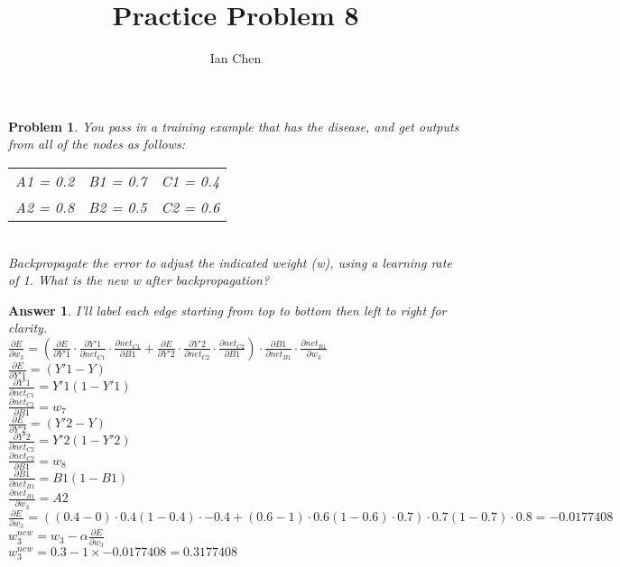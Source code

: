 \documentclass[11pt]{article}
\author{Ian Chen}
\title{Practice Problem 8}
\theoremstyle{description}
\newtheorem{problem}{Problem}
\theoremstyle{break}
\newtheorem*{answer}{Answer}
\begin{document}
    \maketitle

    \begin{problem}
        You pass in a training example that has the disease, and get outputs from all of the
        nodes as follows:\\
        \begin{tabular}{ccc}
            A1 = 0.2 & B1 = 0.7 & C1 = 0.4 \\
            A2 = 0.8 & B2 = 0.5 & C2 = 0.6 \\
        \end{tabular}\\
        Backpropagate the error to adjust the indicated weight (w), using a learning rate of 1.
        What is the new w after backpropagation?
    \end{problem}
    \begin{answer}
        I'll label each edge starting from top to bottom then left to right for clarity.\\
        $\frac{\partial E}{\partial w_3} =
        (\frac{\partial E}{\partial Y'1} \cdot
        \frac{\partial Y'1}{\partial net_{C1}} \cdot
        \frac{\partial net_{C1}}{\partial B1} +
        \frac{\partial E}{\partial Y'2} \cdot
        \frac{\partial Y'2}{\partial net_{C2}} \cdot
        \frac{\partial net_{C2}}{\partial B1}) \cdot
        \frac{\partial B1}{\partial net_{B1}} \cdot
        \frac{\partial net_{B1}}{\partial w_3}$\\
        $\frac{\partial E}{\partial Y'1} = (Y'1 - Y)$\\
        $\frac{\partial Y'1}{\partial net_{C1}} = Y'1(1 - Y'1)$\\
        $\frac{\partial net_{C1}}{\partial B1} = w_7$\\
        $\frac{\partial E}{\partial Y'2} = (Y'2 - Y)$\\
        $\frac{\partial Y'2}{\partial net_{C2}} = Y'2(1 - Y'2)$\\
        $\frac{\partial net_{C2}}{\partial B1} = w_8$\\
        $\frac{\partial B1}{\partial net_{B1}} = B1(1 - B1)$\\
        $\frac{\partial net_{B1}}{\partial w_3} = A2$\\
        $\frac{\partial E}{\partial w_3} = ((0.4 - 0) \cdot 0.4(1 - 0.4) \cdot -0.4 +
        (0.6 - 1) \cdot 0.6(1 - 0.6) \cdot 0.7) \cdot 0.7(1 - 0.7) \cdot 0.8 = -0.0177408$\\
        $w_3^{new} = w_3 - \alpha \frac{\partial E}{\partial w_3}$\\
        $w_3^{new} = 0.3 - 1 \times -0.0177408 = 0.3177408$
    \end{answer}
\end{document}

